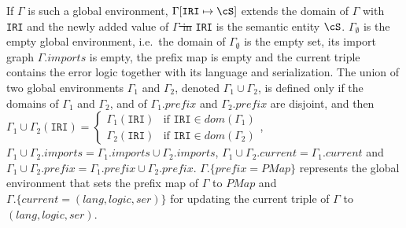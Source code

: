 \documentclass[10pt,fleqn,final]{scrreprt}
\newcommand*{\syntax}[1]{\texttt{#1}}
\newcommand{\semdom}[1]{
\begin{center}
\fbox{$#1$}
\end{center}
}
\newcommand{\prefix}{\mathit{prefix}}
\newcommand{\current}{\mathit{current}}
\newcommand{\PMap}{\mathit{PMap}}
\providecommand{\DIFadd}[1]{{\protect\color{blue}\uwave{#1}}} %
\providecommand{\DIFdel}[1]{{\protect\color{red}\sout{#1}}}                      %
\providecommand{\DIFaddbegin}{} %
\providecommand{\DIFaddend}{} %
\providecommand{\DIFdelbegin}{} %
\providecommand{\DIFdelend}{} %
\begin{document}
If $\Gamma$ is such a global environment, $\Gamma[\syntax{IRI} \mapsto \cS]$
extends the domain of $\Gamma$ with \syntax{IRI} and
the newly added value of \DIFdelbegin \DIFdel{$\Gamma$ in }\DIFdelend \syntax{IRI} \DIFaddbegin \DIFadd{in $\Gamma$ }\DIFaddend is the semantic entity $\cS$.
 $\Gamma_\emptyset$ is the empty global environment, i.e.~the domain of $\Gamma_\emptyset$ is the empty set, its import graph $\Gamma.imports$ is empty,
the prefix map is empty and the current triple contains the error logic together with its language and serialization.
The union of two global environments $\Gamma_1$ and $\Gamma_2$, 
denoted $\Gamma_1\cup\Gamma_2$, is defined only if the domains of $\Gamma_1$ and $\Gamma_2$,
and of $\Gamma_1.\prefix$ and $\Gamma_2.\prefix$ are disjoint, and then
$\Gamma_1\cup\Gamma_2(\syntax{IRI}) = \begin{cases}
\Gamma_1(\syntax{IRI})& \mbox{if } \syntax{IRI} \in dom(\Gamma_1) \\
\Gamma_2(\syntax{IRI})& \mbox{if } \syntax{IRI} \in dom(\Gamma_2)
\end{cases}$, 
$\Gamma_1\cup\Gamma_2.imports = \Gamma_1.imports \cup \Gamma_2.imports$,
$\Gamma_1\cup\Gamma_2.\current = \Gamma_1.\current$
and $\Gamma_1\cup\Gamma_2.\prefix = \Gamma_1.\prefix \cup \Gamma_2.\prefix$.
  $\Gamma.\{\prefix = \PMap\}$ represents the global environment that sets the prefix map of 
$\Gamma$ to $\PMap$ and $\Gamma.\{\current  = (lang, logic, ser)\}$ \DIFaddbegin \DIFadd{is used }\DIFaddend for 
updating the current triple of $\Gamma$ to $(lang, logic, ser)$.



%
\end{document}
